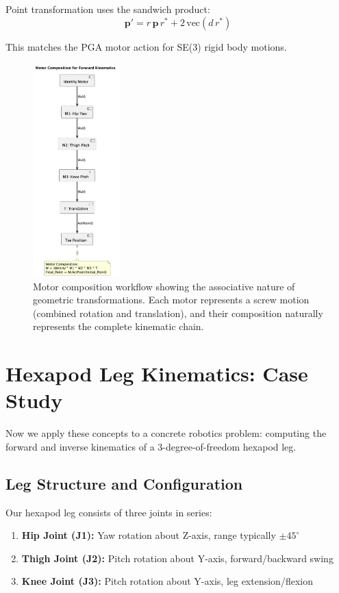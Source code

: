 \documentclass[11pt]{article}
\begin{document}
Point transformation uses the sandwich product:
\[\mathbf{p}' = r\,\mathbf{p}\,r^* + 2\,\mathrm{vec}(d\,r^*)\]

This matches the PGA motor action for SE(3) rigid body motions.

\begin{figure}[H]
    \centering
    \includegraphics[width=0.3\textwidth]{illustrations/motor_composition.png}
    \caption{Motor composition workflow showing the associative nature of geometric transformations. Each motor represents a screw motion (combined rotation and translation), and their composition naturally represents the complete kinematic chain.}
    \label{fig:motor_composition}
\end{figure}

\section{Hexapod Leg Kinematics: Case Study}

Now we apply these concepts to a concrete robotics problem: computing the forward and inverse kinematics of a 3-degree-of-freedom hexapod leg.

\subsection{Leg Structure and Configuration}

Our hexapod leg consists of three joints in series:
\begin{enumerate}
    \item \textbf{Hip Joint (J1):} Yaw rotation about Z-axis, range typically $\pm 45^\circ$
    \item \textbf{Thigh Joint (J2):} Pitch rotation about Y-axis, forward/backward swing
    \item \textbf{Knee Joint (J3):} Pitch rotation about Y-axis, leg extension/flexion
\end{enumerate}
\end{document}
